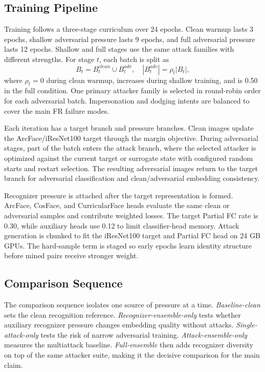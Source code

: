 \documentclass[conference]{IEEEtran}
\begin{document}
\subsection{Training Pipeline}
Training follows a three-stage curriculum over 24 epochs. Clean warmup lasts
3 epochs, shallow adversarial pressure lasts 9 epochs, and full adversarial
pressure lasts 12 epochs. Shallow and full stages use the same attack families
with different strengths. For stage $t$, each batch is split as
\begin{equation}
    B_t=B^{clean}_t\cup B^{adv}_t,\quad
    |B^{adv}_t|=\rho_t |B_t|,
\end{equation}
where $\rho_t=0$ during clean warmup, increases during shallow training, and is
0.50 in the full condition. One primary attacker family is selected in
round-robin order for each adversarial batch. Impersonation and dodging intents
are balanced to cover the main FR failure modes.

Each iteration has a target branch and pressure branches. Clean images update
the ArcFace/iResNet100 target through the margin objective. During adversarial
stages, part of the batch enters the attack branch, where the selected attacker
is optimized against the current target or surrogate state with configured
random starts and restart selection. The resulting adversarial images return to
the target branch for adversarial classification and clean/adversarial
embedding consistency.

Recognizer pressure is attached after the target representation is formed.
ArcFace, CosFace, and CurricularFace heads evaluate the same clean or
adversarial samples and contribute weighted losses. The target Partial FC rate
is 0.30, while auxiliary heads use 0.12 to limit classifier-head memory.
Attack generation is chunked to fit the iResNet100 target and Partial FC head
on 24 GB GPUs. The hard-sample term is staged so early epochs learn identity
structure before mined pairs receive stronger weight.

\subsection{Comparison Sequence}
The comparison sequence isolates one source of pressure at a time.
\emph{Baseline-clean} sets the clean recognition reference.
\emph{Recognizer-ensemble-only} tests whether auxiliary recognizer pressure
changes embedding quality without attacks. \emph{Single-attack-only} tests the
risk of narrow adversarial training. \emph{Attack-ensemble-only} measures the
multiattack baseline. \emph{Full-ensemble} then adds recognizer diversity on
top of the same attacker suite, making it the decisive comparison for the main
claim.
\end{document}
